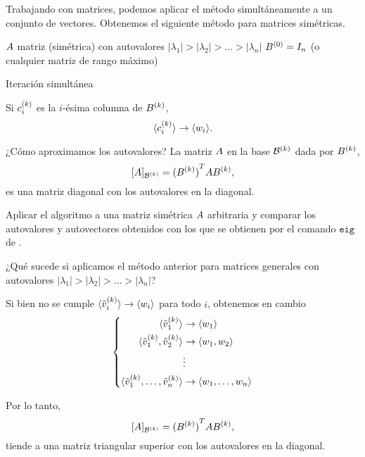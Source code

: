 Trabajando con matrices, podemos aplicar el método simultáneamente a un conjunto de vectores. Obtenemos el siguiente método para matrices simétricas.

{\small
\begin{algorithm}[H]
\SetAlgoLined
$\Ab$ matriz (simétrica) con autovalores $|\lambda_1| > |\lambda_2| > \dots > |\lambda_n|$\;
$\Bb^{(0)} = \Ib_n$ (o cualquier matriz de rango máximo)\;
 \caption{Iteración simultánea}
\end{algorithm}
}

Si $\cb_i^{(k)}$ es la $i$-ésima columna de $\Bb^{(k)}$,
$$
\langle \cb_i^{(k)} \rangle \rightarrow \langle \wb_i \rangle.
$$

¿Cómo aproximamos los autovalores? La matriz $\Ab$ en la base $\mathcal B^{(k)}$ dada por $\Bb^{(k)}$,
$$
[\Ab]_{\B^{(k)}} = {(\Bb^{(k)})}^T \Ab \Bb^{(k)},
$$
es una matriz diagonal con los autovalores en la diagonal.


\begin{ejercicio} Aplicar el algoritmo a una matriz simétrica $\Ab$ arbitraria y comparar los autovalores y autovectores obtenidos con los que se obtienen por el comando $\texttt{eig}$ de \python.
\end{ejercicio}


¿Qué sucede si aplicamos el método anterior para matrices generales con autovalores  $|\lambda_1| > |\lambda_2| > \dots > |\lambda_n|$?

Si bien no se cumple $\langle \tilde \vb_i^{(k)} \rangle \rightarrow \langle \wb_i \rangle$ para todo $i$, obtenemos en cambio
$$
\left\{
\begin{aligned}
\langle \tilde \vb_1^{(k)} \rangle &\rightarrow \langle \wb_1 \rangle \\
\langle \tilde \vb_1^{(k)}, \tilde \vb_2^{(k)} \rangle &\rightarrow \langle \wb_1, \wb_2 \rangle \\
&\vdots \\
\langle \tilde \vb_1^{(k)}, \dots, \tilde \vb_n^{(k)} \rangle &\rightarrow \langle \wb_1, \dots, \wb_n \rangle \\
\end{aligned}
\right.
$$

Por lo tanto,
$$
[\Ab]_{\B^{(k)}} = {(\Bb^{(k)})}^T \Ab \Bb^{(k)},
$$
tiende a una matriz triangular superior con los autovalores en la diagonal.


